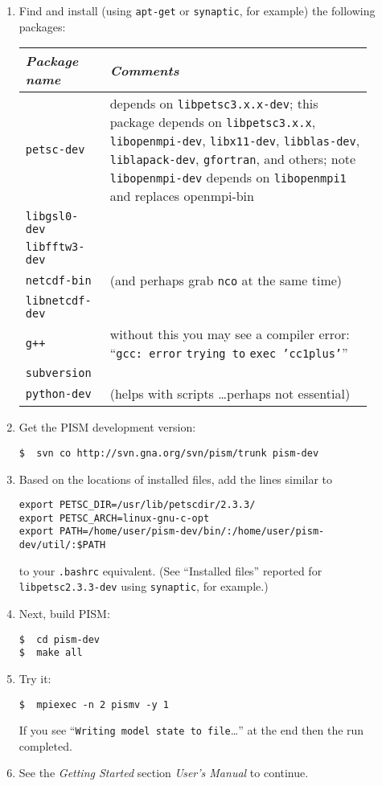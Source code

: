 \documentclass[11pt,final]{amsart}
\begin{document}
\begin{enumerate}
\item Find and install (using \texttt{apt-get} or \texttt{synaptic}, for example) the following packages:
  \begin{center}
    \begin{tabular*}{0.9\linewidth}{p{0.2\linewidth}p{0.7\linewidth}}
      \toprule
      \emph{Package name} & \emph{Comments}\\
      \midrule
      \texttt{petsc-dev} & depends on \texttt{libpetsc3.x.x-dev}; this package 
      depends on \texttt{libpetsc3.x.x}, \texttt{libopenmpi-dev}, \texttt{libx11-dev},
      \texttt{libblas-dev}, \texttt{liblapack-dev}, \texttt{gfortran}, and others; 
      note \texttt{libopenmpi-dev} depends on \texttt{libopenmpi1} and
      replaces openmpi-bin\\
      \texttt{libgsl0-dev} & \\
      \texttt{libfftw3-dev} & \\
      \texttt{netcdf-bin} & (and perhaps grab \texttt{nco} at the same time)\\
      \texttt{libnetcdf-dev} & \\
      \texttt{g++} & without this you may see a compiler error: ``\texttt{gcc: error} \texttt{trying to} \texttt{exec 'cc1plus'}''\\
      \texttt{subversion} & \\
      \texttt{python-dev} & (helps with scripts \dots perhaps not essential) \\
      \bottomrule
    \end{tabular*}
  \end{center}
\item Get the PISM development version:
\begin{verbatim}
$  svn co http://svn.gna.org/svn/pism/trunk pism-dev
\end{verbatim}
\item Based on the locations of installed files, add the lines similar to
\begin{verbatim}
export PETSC_DIR=/usr/lib/petscdir/2.3.3/
export PETSC_ARCH=linux-gnu-c-opt
export PATH=/home/user/pism-dev/bin/:/home/user/pism-dev/util/:$PATH
\end{verbatim}
to your \texttt{.bashrc} equivalent.  (See ``Installed files'' reported for \texttt{libpetsc2.3.3-dev} using \texttt{synaptic}, for example.)
\item Next, build PISM:
\begin{verbatim}
$  cd pism-dev
$  make all
\end{verbatim}
\item Try it:
\begin{verbatim}
$  mpiexec -n 2 pismv -y 1
\end{verbatim}
If you see ``\texttt{Writing model state to file}\dots'' at the end then the run completed.
\item See the \emph{Getting Started} section \emph{User's Manual} to continue.
\end{enumerate}
\end{document}
